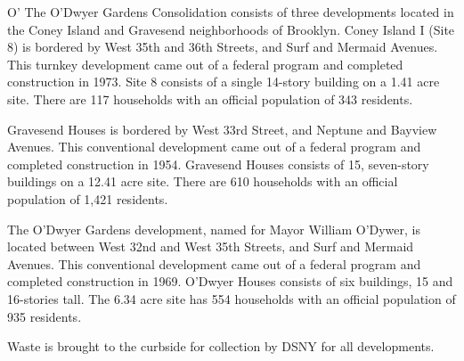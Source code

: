 O'
The O'Dwyer Gardens Consolidation consists of three developments located in the Coney Island and Gravesend neighborhoods of Brooklyn. Coney Island I (Site 8) is bordered by West 35th and 36th Streets, and Surf and Mermaid Avenues. This turnkey development came out of a federal program and completed construction in 1973. Site 8 consists of a single 14-story building on a 1.41 acre site. There are 117 households with an official population of 343 residents.

Gravesend Houses is bordered by West 33rd Street, and Neptune and Bayview Avenues. This conventional development came out of a federal program and completed construction in 1954. Gravesend Houses consists of 15, seven-story buildings on a 12.41 acre site. There are 610 households with an official population of 1,421 residents. 

The O'Dwyer Gardens development, named for Mayor William O'Dywer, is located between West 32nd and West 35th Streets, and Surf and Mermaid Avenues. This conventional development came out of a federal program and completed construction in 1969. O'Dwyer Houses consists of six buildings, 15 and 16-stories tall. The 6.34 acre site has 554 households with an official population of 935 residents.

Waste is brought to the curbside for collection by DSNY for all developments.